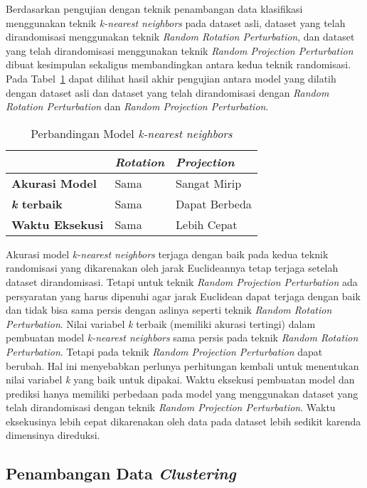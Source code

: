 Berdasarkan pengujian dengan teknik penambangan data klasifikasi menggunakan teknik \textit{k-nearest neighbors} pada dataset asli, dataset yang telah dirandomisasi menggunakan teknik \textit{Random Rotation Perturbation}, dan dataset yang telah dirandomisasi menggunakan teknik \textit{Random Projection Perturbation} dibuat kesimpulan sekaligus membandingkan antara kedua teknik randomisasi. Pada Tabel~\ref{table:perbandingan-klasifikasi} dapat dilihat hasil akhir pengujian antara model yang dilatih dengan dataset asli dan dataset yang telah dirandomisasi dengan \textit{Random Rotation Perturbation} dan \textit{Random Projection Perturbation}.

\begin{table}
	\centering
	\caption{Perbandingan Model \textit{k-nearest neighbors}}
	\begin{tabular}{|l|l|l|}
		\hline
		& \textbf{\textit{Rotation}} & \textbf{\textit{Projection}} \\ \hline
		\textbf{Akurasi Model} & Sama & Sangat Mirip \\
		\textbf{\textit{k} terbaik} & Sama & Dapat Berbeda \\
		\textbf{Waktu Eksekusi} & Sama & Lebih Cepat \\
		\hline
	\end{tabular}
	\label{table:perbandingan-klasifikasi}
\end{table}

Akurasi model \textit{k-nearest neighbors} terjaga dengan baik pada kedua teknik randomisasi yang dikarenakan oleh jarak Euclideannya tetap terjaga setelah dataset dirandomisasi. Tetapi untuk teknik \textit{Random Projection Perturbation} ada persyaratan yang harus dipenuhi agar jarak Euclidean dapat terjaga dengan baik dan tidak bisa sama persis dengan aslinya seperti teknik \textit{Random Rotation Perturbation}. Nilai variabel \textit{k} terbaik (memiliki akurasi tertingi) dalam pembuatan model \textit{k-nearest neighbors} sama persis pada teknik \textit{Random Rotation Perturbation}. Tetapi pada teknik \textit{Random Projection Perturbation} dapat berubah. Hal ini menyebabkan perlunya perhitungan kembali untuk menentukan nilai variabel \textit{k} yang baik untuk dipakai. Waktu eksekusi pembuatan model dan prediksi hanya memiliki perbedaan pada model yang menggunakan dataset yang telah dirandomisasi dengan teknik \textit{Random Projection Perturbation}. Waktu eksekusinya lebih cepat dikarenakan oleh data pada dataset lebih sedikit karenda dimensinya direduksi.

\subsection{Penambangan Data \textit{Clustering}}
\label{subsec:pengujian-clustering}

